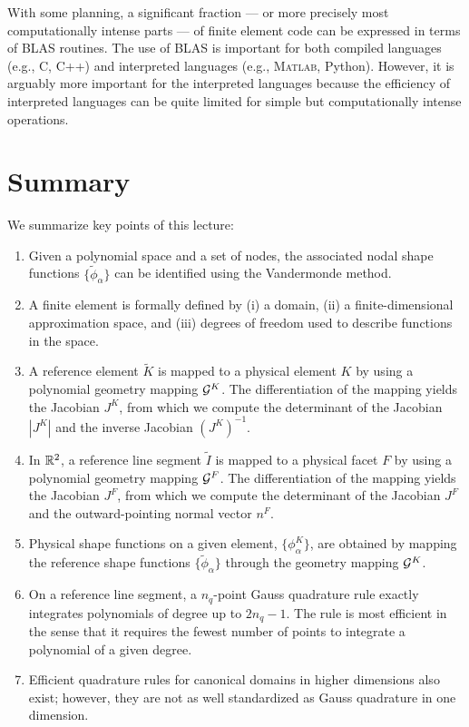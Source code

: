 With some planning, a significant fraction --- or more precisely most computationally intense parts --- of finite element code can be expressed in terms of BLAS routines. The use of BLAS is important for both compiled languages (e.g., C, C++) and interpreted languages (e.g., \textsc{Matlab}, Python).  However, it is arguably more important for the interpreted languages because the efficiency of interpreted languages can be quite limited for simple but computationally intense operations.

\section{Summary}
We summarize key points of this lecture:
\begin{enumerate}
\item Given a polynomial space and a set of nodes, the associated nodal shape functions $\{\tilde \phi_\alpha\}$ can be identified using the Vandermonde method.
\item A finite element is formally defined by (i) a domain, (ii) a finite-dimensional approximation space, and (iii) degrees of freedom used to describe functions in the space.
\item A reference element $\tilde K$ is mapped to a physical element $K$ by using a polynomial geometry mapping $\mathcal{G}^K$.  The differentiation of the mapping yields the Jacobian $J^K$, from which we compute the determinant of the Jacobian $|J^K|$ and the inverse Jacobian $(J^K)^{-1}$.
\item In $\mathbb{R}^2$, a reference line segment $\tilde I$ is mapped to a physical facet $F$ by using a polynomial geometry mapping $\mathcal{G}^F$.  The differentiation of the mapping yields the Jacobian $J^F$, from which we compute the determinant of the Jacobian $J^F$ and the outward-pointing normal vector $n^F$.
\item Physical shape functions on a given element, $\{\phi^K_\alpha\}$, are obtained by mapping the reference shape functions $\{\tilde \phi_\alpha\}$ through the geometry mapping $\mathcal{G}^K$.
\item On a reference line segment, a $n_q$-point Gauss quadrature rule exactly integrates polynomials of degree up to $2n_q - 1$.  The rule is most efficient in the sense that it requires the fewest number of points to integrate a polynomial of a given degree.
\item Efficient quadrature rules for canonical domains in higher dimensions also exist; however, they are not as well standardized as Gauss quadrature in one dimension.

\end{enumerate}

